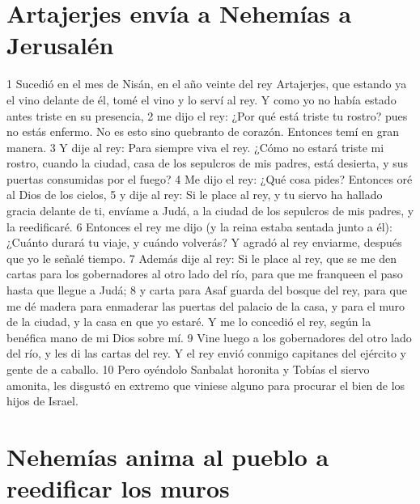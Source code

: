 \section*{Artajerjes envía a Nehemías a Jerusalén}

1 Sucedió en el mes de Nisán, en el año veinte del rey Artajerjes, que estando ya el vino delante de él, tomé el vino y lo serví al rey. Y como yo no había estado antes triste en su presencia,
2 me dijo el rey: ¿Por qué está triste tu rostro? pues no estás enfermo. No es esto sino quebranto de corazón. Entonces temí en gran manera.
3 Y dije al rey: Para siempre viva el rey. ¿Cómo no estará triste mi rostro, cuando la ciudad, casa de los sepulcros de mis padres, está desierta, y sus puertas consumidas por el fuego? 
4 Me dijo el rey: ¿Qué cosa pides? Entonces oré al Dios de los cielos,
5 y dije al rey: Si le place al rey, y tu siervo ha hallado gracia delante de ti, envíame a Judá, a la ciudad de los sepulcros de mis padres, y la reedificaré.
6 Entonces el rey me dijo (y la reina estaba sentada junto a él): ¿Cuánto durará tu viaje, y cuándo volverás? Y agradó al rey enviarme, después que yo le señalé tiempo.
7 Además dije al rey: Si le place al rey, que se me den cartas para los gobernadores al otro lado del río, para que me franqueen el paso hasta que llegue a Judá;
8 y carta para Asaf guarda del bosque del rey, para que me dé madera para enmaderar las puertas del palacio de la casa, y para el muro de la ciudad, y la casa en que yo estaré. Y me lo concedió el rey, según la benéfica mano de mi Dios sobre mí.
9 Vine luego a los gobernadores del otro lado del río, y les di las cartas del rey. Y el rey envió conmigo capitanes del ejército y gente de a caballo.
10 Pero oyéndolo Sanbalat horonita y Tobías el siervo amonita, les disgustó en extremo que viniese alguno para procurar el bien de los hijos de Israel.

\section*{Nehemías anima al pueblo a reedificar los muros}

